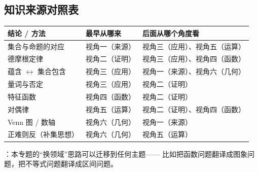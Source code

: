 \begin{afterclass}
\subsection{知识来源对照表}
\begin{center}
\footnotesize
\setlength{\tabcolsep}{4pt}
\renewcommand{\arraystretch}{1.35}
\begin{tabular}{p{3.6cm}p{3.8cm}p{5.6cm}}
\toprule
结论 / 方法 & 最早从哪来 & 后面从哪个角度看 \\
\midrule
集合与命题的对应 & 视角一（来源） & 视角三（应用）、视角五（运算） \\
德摩根定律 & 视角二（证明） & 视角三（应用）、视角四（函数） \\
蕴含 $\leftrightarrow$ 集合包含 & 视角三（应用） & 视角一（来源）、视角六（几何） \\
量词与否定 & 视角三（应用） & 视角二（证明） \\
特征函数 & 视角四（函数） & 视角二（证明） \\
对偶律 & 视角五（运算） & 视角二（证明）、视角四（函数） \\
Venn 图 / 数轴 & 视角六（几何） & 视角一（来源） \\
正难则反（补集思想） & 视角六（几何） & 视角五（运算） \\
\bottomrule
\end{tabular}
\end{center}

：本专题的“换领域”思路可以迁移到任何主题——
比如把函数问题翻译成图象问题，把不等式问题翻译成区间问题。
\end{afterclass}
